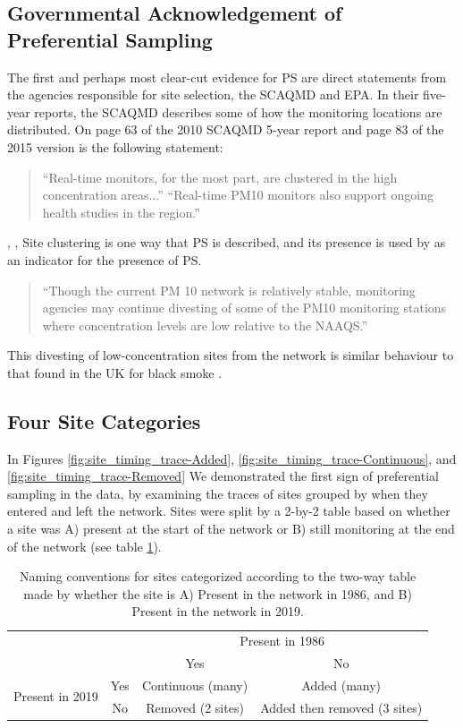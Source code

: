 \subsection{Governmental Acknowledgement of Preferential Sampling} \label{subsec:govPrefSamp}
The first and perhaps most clear-cut evidence for \ac{PS} are direct statements from the agencies responsible for site selection, the \ac{SCAQMD} and \ac{EPA}.  In their five-year reports, the \ac{SCAQMD} describes some of how the monitoring locations are distributed.  On page 63 of the 2010 \ac{SCAQMD} 5-year report and page 83 of the 2015 version is the following statement:
\begin{quote}
	``Real-time monitors, for the most part, are clustered in the high concentration areas...''  ``Real-time \ac{PM10} monitors also support ongoing health studies in the region.''    
\end{quote} \cite{CASCAQMD:2010}, \cite{CASCAQMD:2015}, \cite{AQMNP:2019}
Site clustering is one way that \ac{PS} is described, and its presence is used by \cite{watson2020} as an indicator for the presence of \ac{PS}. 

\begin{quote}
	``Though the current PM 10 network is relatively stable, monitoring agencies may  continue divesting of some of the PM10 monitoring stations where concentration levels are low relative to the NAAQS.''
\end{quote} \cite{EPA:IntegratedReview}
This divesting of low-concentration sites from the network is similar behaviour to that found in the UK for black smoke \citep{zidek2010monitoring}.

\subsection{Four Site Categories}\label{sec:4sitecategories}
In Figures \ref{fig:site_timing_trace-Added}, \ref{fig:site_timing_trace-Continuous}, and \ref{fig:site_timing_trace-Removed} We demonstrated the first sign of preferential sampling in the data, by examining the traces of sites grouped by when they entered and left the network.  Sites were split by a 2-by-2 table based on whether a site was A) present at the start of the network or B) still monitoring at the end of the network (see table \ref{tab:2X2_site_category}).

\begin{table}[ht]
	\centering
	\begin{tabular}{| c c | c c |}
		\hline
		\multirow{2}{*}{} & {} & \multicolumn{2}{c}{Present in 1986} \\
		& {} & Yes & No \\
		\hline 
		\multirow{2}{*}{Present in 2019} & Yes & Continuous (many) & Added (many) \\
		& No & Removed (2 sites) & Added then removed (3 sites)   \\
		\hline
	\end{tabular}
	\caption{Naming conventions for sites categorized according to the two-way table made by whether the site is A) Present in the network in 1986, and B) Present in the network in 2019.}
	\label{tab:2X2_site_category}
\end{table}

